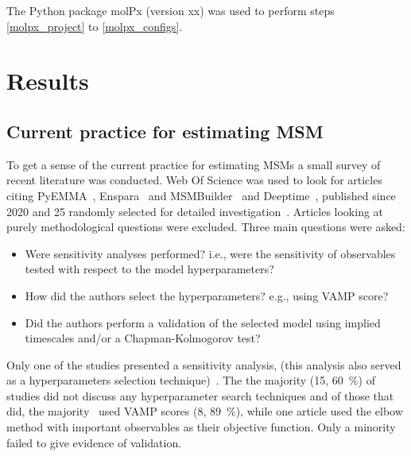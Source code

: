 \documentclass[journal=jacsat,manuscript=article]{achemso}
\begin{document}
The Python package molPx (version xx) was used to perform steps \ref{molpx_project} to \ref{molpx_configs}. 

\section{Results}

\subsection{Current practice for estimating MSM}

To get a sense of the current practice for estimating MSMs a small survey of recent literature was conducted. Web Of Science was used to look for articles citing PyEMMA~\cite{schererPyEMMASoftwarePackage2015a}, Enspara~\cite{porter_enspara_2019} and MSMBuilder~\cite{beauchamp_msmbuilder2:_2011} and Deeptime~\cite{deeptime}, published since 2020 and 25 randomly selected for detailed investigation~\cite{tosstorff_study_2020, fernandez-quintero_mutation_2021, kahler_sodium-induced_2020, paul_thermodynamics_2021, quoika_implementation_2021, liu_misfolding_2020, tian_deciphering_2020, hempel_molecular_2021, koulgi_structural_2021., sharma_comparative_2020, mckiernan_dynamical_2020, dutta_distinct_2022, zhou_molecular_2021, fernandez-quintero_cdr_2022, song_modulation_2021, sadiq_multiscale_2021, ibrahim_dynamics_2022, linker_polarapolar_2022, hu_discovery_2022, cannariato_prediction_2022, jones_determining_2021, zhu_critical_2021, zhu_critical_2021, bergh_markov_2021, pantsar_decisive_2022, grabski_molecular_2021}. Articles looking at purely methodological questions were excluded. Three main questions were asked: 
\begin{itemize}
    \item Were sensitivity analyses performed? i.e., were the sensitivity of observables tested with respect to the model hyperparameters?
    \item How did the authors select the hyperparameters? e.g., using VAMP score? 
    \item Did the authors perform a validation of the selected model using implied timescales and/or a Chapman-Kolmogorov test? 
\end{itemize}

Only one of the studies presented a sensitivity analysis, (this analysis also served as a hyperparameters selection technique)~\cite{bergh_markov_2021}. The the majority (15, \SI{60}{\percent}) of studies did not discuss any hyperparameter search techniques and of those that did,  the majority~\cite{paul_thermodynamics_2021, koulgi_structural_2021, sharma_comparative_2020, dutta_distinct_2022, zhou_molecular_2021, jones_determining_2021, zhu_critical_2021, grabski_molecular_2021} used VAMP scores (8, \SI{89}{\percent}), while one article used the elbow method with important observables \cite{bergh_markov_2021} as their objective function. Only a minority~\cite{quoika_implementation_2021, hempel_molecular_2021, song_modulation_2021, ibrahim_dynamics_2022} failed to give evidence of validation.  
\end{document}
